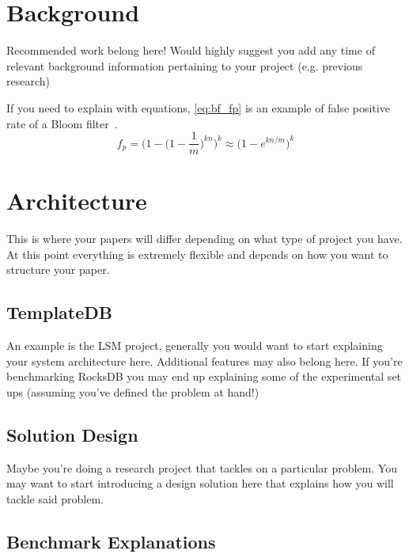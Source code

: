 \documentclass[sigconf]{acmart}
\begin{document}
\section{Background}
Recommended work belong here! Would highly suggest you add any time of relevant
background information pertaining to your project (e.g. previous research)

If you need to explain with equations, \ref{eq:bf_fp} is an example of false positive 
rate of a Bloom filter~\cite{Bloom}.
\begin{equation}
    f_p = \Big(1-\Big(1-\frac{1}{m}\Big)^{kn}\Big)^{k} \approx \Big(1-e^{kn/m} \Big)^{k}
    \label{eq:bf_fp}
 \end{equation}

\section{Architecture}
This is where your papers will differ depending on what type of project you
have. At this point everything is extremely flexible and depends on how you
want to structure your paper.

\subsection{TemplateDB}

An example is the LSM project, generally you would want to start explaining
your system architecture here. Additional features may also belong here. If
you're benchmarking RocksDB you may end up explaining some of the experimental
set ups (assuming you've defined the problem at hand!)


\subsection{Solution Design}

Maybe you're doing a research project that tackles on a particular problem. You
may want to start introducing a design solution here that explains how you will
tackle said problem.

\subsection{Benchmark Explanations}
\end{document}
